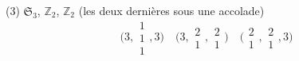 \documentclass[11pt,a4paper]{article}
\begin{document}
(3) \quad {} \quad $\mathfrak{S}_3$, \quad $\mathbb{Z}_2$, \quad $\mathbb{Z}_2$ (les deux dernières sous une accolade)
\[
  \bigl(3, \begin{smallmatrix}1\\1\\1\end{smallmatrix}, 3\bigr) \quad
  \bigl(3, \begin{smallmatrix}2\\1\end{smallmatrix}, \begin{smallmatrix}2\\1\end{smallmatrix}\bigr) \quad
  \bigl(\begin{smallmatrix}2\\1\end{smallmatrix}, \begin{smallmatrix}2\\1\end{smallmatrix}, 3\bigr)
\]
\end{document}
